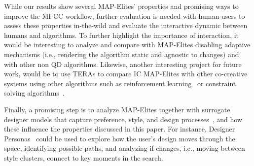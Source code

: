 While our results show several MAP-Elites’ properties and promising ways to improve the MI-CC workflow, further evaluation is needed with human users to assess these properties in-the-wild and evaluate the interactive dynamic between humans and algorithms. To further highlight the importance of interaction, it would be interesting to analyze and compare with MAP-Elites disabling adaptive mechanisms (i.e., rendering the algorithm static and agnostic to changes) and with other non QD algorithms. Likewise, another interesting project for future work, would be to use TERAs to compare IC MAP-Elites with other co-creative systems using other algorithms such as reinforcement learning~\cite{p9delarosa2020-RLbrushMixedinit,guzdial-lvldsg-aiide-2018} or constraint solving algorithms~\cite{p9Karth2019-pcgmlDiscriminativeLearning}.
 




Finally, a promising step is to analyze MAP-Elites together with surrogate designer models that capture preference, style, and design processes~\cite{p9Liapis2013-designerModel,Alvarez2020-DesignerPreference,alvarez2020-designerpersonas}, and how these influence the properties discussed in this paper. For instance, Designer Personas~\cite{p9alvarez2020-designerpersonas} could be used to explore how the user's design moves through the space, identifying possible paths, and analyzing if changes, i.e., moving between style clusters, connect to key moments in the search.